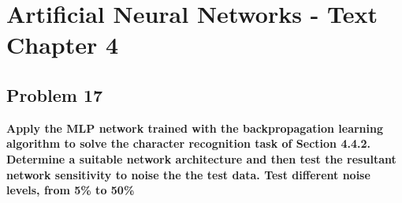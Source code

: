 \chapter{Artificial Neural Networks - Text Chapter 4}

\section{Problem 17}

\textbf{Apply the MLP network trained with the backpropagation learning algorithm to solve the character recognition task of Section 4.4.2.} \newline \\
\textbf{Determine a suitable network architecture and then test the resultant network sensitivity to noise the the test data. Test different noise levels, from 5\% to 50\%}


